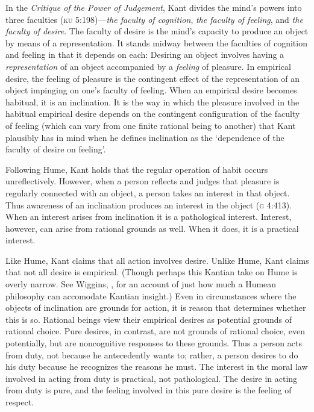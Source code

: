 \documentclass[12pt]{article}
\begin{document}
In the \emph{Critique of the Power of Judgement}, Kant divides the mind's powers into three faculties (\textsc{ku} 5:198)---\emph{the faculty of cognition}, \emph{the faculty of feeling}, and \emph{the faculty of desire}. The faculty of desire is the mind's capacity to produce an object by means of a representation. It stands midway between the faculties of cognition and feeling in that it depends on each: Desiring an object involves having a \emph{representation} of an object accompanied by a \emph{feeling} of pleasure. In empirical desire, the feeling of pleasure is the contingent effect of the representation of an object impinging on one's faculty of feeling. When an empirical desire becomes habitual, it is an inclination. It is the way in which the pleasure involved in the habitual empirical desire depends on the contingent configuration of the faculty of feeling (which can vary from one finite rational being to another) that Kant plausibly has in mind when he defines inclination as the `dependence of the faculty of desire on feeling'.

Following Hume, Kant holds that the regular operation of habit occurs unreflectively. However, when a person reflects and judges that pleasure is regularly connected with an object, a person takes an interest in that object. Thus awareness of an inclination produces an interest in the object (\textsc{g} 4:413). When an interest arises from inclination it is a pathological interest. Interest, however, can arise from rational grounds as well. When it does, it is a practical interest.

Like Hume, Kant claims that all action involves desire. Unlike Hume, Kant claims that not all desire is empirical. (Though perhaps this Kantian take on Hume is overly narrow. See Wiggins, \citeyear{Wiggins:1995fk}, for an account of just how much a Humean philosophy can accomodate Kantian insight.) Even in circumstances where the objects of inclination are grounds for action, it is reason that determines whether this is so. Rational beings view their empirical desires as potential grounds of rational choice. Pure desires, in contrast, are not grounds of rational choice, even potentially, but are noncognitive responses to these grounds. Thus a person acts from duty, not because he antecedently wants to; rather, a person desires to do his duty because he recognizes the reasons he must. The interest in the moral law involved in acting from duty is practical, not pathological. The desire in acting from duty is pure, and the feeling involved in this pure desire is the feeling of respect.
\end{document}
